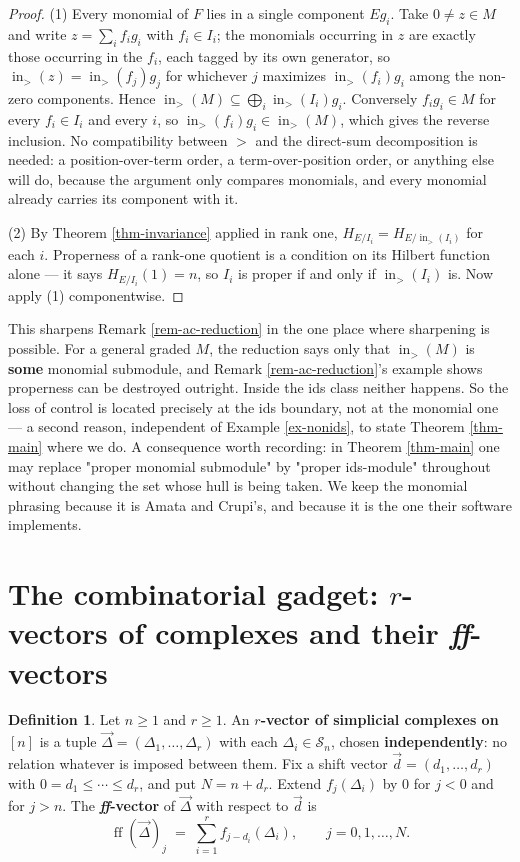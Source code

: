 \documentclass[11pt, a4paper, abstract=yes]{scrartcl}
\theoremstyle{definition}
\newtheorem{definition}{Definition}
\theoremstyle{remark}
\theoremstyle{plain}
\newcommand{\ff}{\operatorname{ff}}
\newcommand{\inn}{\operatorname{in}}
\begin{document}
\begin{proof}
(1) Every monomial of \(F\) lies in a single component \(Eg_i\). Take \(0\ne z\in M\) and write
\(z=\sum_i f_ig_i\) with \(f_i\in I_i\); the monomials occurring in \(z\) are exactly those occurring
in the \(f_i\), each tagged by its own generator, so \(\inn_>(z)=\inn_>(f_j)g_j\) for whichever
\(j\) maximizes \(\inn_>(f_i)g_i\) among the non-zero components. Hence
\(\inn_>(M)\subseteq\bigoplus_i\inn_>(I_i)g_i\). Conversely \(f_ig_i\in M\) for every \(f_i\in I_i\)
and every \(i\), so \(\inn_>(f_i)g_i\in\inn_>(M)\), which gives the reverse inclusion. No
compatibility between \(>\) and the direct-sum decomposition is needed: a position-over-term order, a
term-over-position order, or anything else will do, because the argument only compares monomials, and
every monomial already carries its component with it.

(2) By Theorem \ref{thm-invariance} applied in rank one, \(H_{E/I_i}=H_{E/\inn_>(I_i)}\) for each \(i\).
Properness of a rank-one quotient is a condition on its Hilbert function alone --- it says
\(H_{E/I_i}(1)=n\), so \(I_i\) is proper if and only if \(\inn_>(I_i)\) is. Now apply (1)
componentwise.
\end{proof}

This sharpens Remark \ref{rem-ac-reduction} in the one place where sharpening is possible. For a general
graded \(M\), the reduction says only that \(\inn_>(M)\) is \textbf{some} monomial submodule, and
Remark \ref{rem-ac-reduction}'s example shows properness can be destroyed outright. Inside the ids class
neither happens. So the loss of control is located precisely at the ids boundary, not at the monomial
one --- a second reason, independent of Example \ref{ex-nonids}, to state Theorem \ref{thm-main} where we do.
A consequence worth recording: in Theorem \ref{thm-main} one may replace "proper monomial submodule" by
"proper ids-module" throughout without changing the set whose hull is being taken. We keep the
monomial phrasing because it is Amata and Crupi's, and because it is the one their software
implements.
\section{The combinatorial gadget: \(r\)-vectors of complexes and their \emph{ff}-vectors}
\label{sec-combinatorial}
\begin{definition}
Let \(n\ge1\) and \(r\ge1\). An \textbf{\(r\)-vector of simplicial complexes on
\([n]\)} is a tuple \(\vec\Delta=(\Delta_1,\dots,\Delta_r)\) with each \(\Delta_i\in\mathcal S_n\), chosen
\textbf{independently}: no relation whatever is imposed between them. Fix a shift vector
\(\vec d=(d_1,\dots,d_r)\) with \(0=d_1\le\cdots\le d_r\), and put \(N=n+d_r\). Extend
\(f_j(\Delta_i)\) by \(0\) for \(j<0\) and for \(j>n\). The \textbf{\emph{ff}-vector} of \(\vec\Delta\) with
respect to \(\vec d\) is
\begin{equation}\label{eq:ffvector}
  \ff(\vec\Delta)_j\;=\;\sum_{i=1}^{r}f_{j-d_i}(\Delta_i),\qquad j=0,1,\dots,N .
\end{equation}
\label{def:ffvector}
\label{def-ffvector}
\end{definition}
\end{document}
